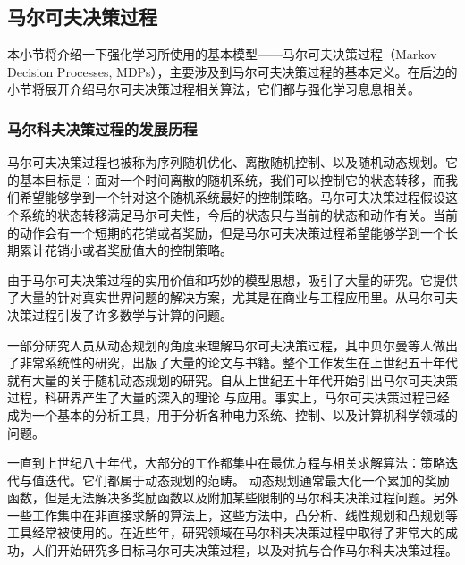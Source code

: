 \subsection{马尔可夫决策过程}

本小节将介绍一下强化学习所使用的基本模型——马尔可夫决策过程（Markov Decision Processes, MDPs），主要涉及到马尔可夫决策过程的基本定义。在后边的小节将展开介绍马尔可夫决策过程相关算法，它们都与强化学习息息相关。

\subsubsection{马尔科夫决策过程的发展历程}

马尔可夫决策过程也被称为序列随机优化、离散随机控制、以及随机动态规划。它的基本目标是：面对一个时间离散的随机系统，我们可以控制它的状态转移，而我们希望能够学到一个针对这个随机系统最好的控制策略。马尔可夫决策过程假设这个系统的状态转移满足马尔可夫性，今后的状态只与当前的状态和动作有关。当前的动作会有一个短期的花销或者奖励，但是马尔可夫决策过程希望能够学到一个长期累计花销小或者奖励值大的控制策略\cite{feinberg2012handbook}。

由于马尔可夫决策过程的实用价值和巧妙的模型思想，吸引了大量的研究。它提供了大量的针对真实世界问题的解决方案，尤其是在商业与工程应用里。从马尔可夫决策过程引发了许多数学与计算的问题。

一部分研究人员从动态规划的角度来理解马尔可夫决策过程，其中贝尔曼等人做出了非常系统性的研究，出版了大量的论文与书籍\cite{bellman1956dynamic,arrow1949bayes,rosling1989optimal,shapley1953stochastic}。整个工作发生在上世纪五十年代就有大量的关于随机动态规划的研究。自从上世纪五十年代开始引出马尔可夫决策过程，科研界产生了大量的深入的理论
与应用\cite{puterman2014markov,fleming2006controlled,howard1960dynamic,altman1999constrained,bertsekas1995neuro}。事实上，马尔可夫决策过程已经成为一个基本的分析工具，用于分析各种电力系统、控制、以及计算机科学领域的问题。

一直到上世纪八十年代，大部分的工作都集中在最优方程与相关求解算法：策略迭代与值迭代。它们都属于动态规划的范畴。 动态规划通常最大化一个累加的奖励函数，但是无法解决多奖励函数以及附加某些限制的马尔科夫决策过程问题。另外一些工作集中在非直接求解的算法上\cite{wilson2007multi,andreas2017modular,altman1999constrained}，这些方法中，凸分析、线性规划和凸规划等工具经常被使用的。在近些年，研究领域在马尔科夫决策过程中取得了非常大的成功\cite{mnih2013playing,silver2016mastering,schulman2015trust}，人们开始研究多目标马尔可夫决策过程\cite{andreas2017modular}，以及对抗与合作马尔科夫决策过程\cite{hu1998multiagent}。

